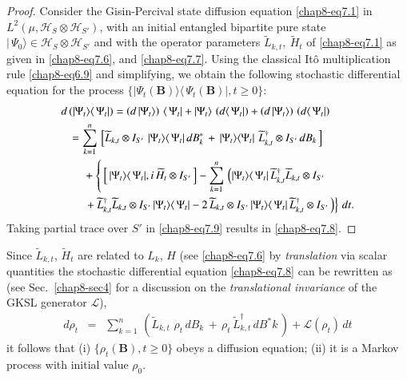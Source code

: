 \begin{proof}
Consider the Gisin-Percival state diffusion equation \eqref{chap8-eq7.1} in\break $L^2(\mu, \mathcal{H}_S\otimes\mathcal{H}_{S'})$, with an initial entangled bipartite pure state $\vert\,\Psi_0\rangle\in \mathcal{H}_S\otimes\mathcal{H}_{S'}$ and with the operator parameters  $\widetilde{L}_{k,t},\  \widetilde{H}_t$ of 
\eqref{chap8-eq7.1} as given in \eqref{chap8-eq7.6}, and \eqref{chap8-eq7.7}. Using the classical It{\^o} multiplication rule  \eqref{chap8-eq6.9} and simplifying, we obtain the following stochastic differential equation for the process $\{\vert\Psi_t(\mathbf{B})\rangle\langle\, \Psi_t(\mathbf{B})\vert, t\geq 0\}$:  
\begin{align}
		d\, & (\vert\Psi_t\rangle  \langle\, \Psi_t\vert)= \left( d\, \vert\Psi_t\rangle\right)\, \langle\,\Psi_t\vert+ \vert\Psi_t\rangle\, \left(d\langle\, \Psi_t\vert\right) + \left( d\, \vert\Psi_t\rangle\right)\,  \left(d\langle\, \Psi_t\vert\right) \notag\\
		&= \sum_{k=1}^{n}\,\left[\widetilde{L}_{k,t}\otimes I_{S'}\,\, \vert\Psi_t\rangle\langle\, \Psi_t\vert\, dB^*_{k}\, + \, \vert\Psi_t\rangle\langle \Psi_t\vert\,\,\widetilde{L}^\dag_{k,t}\otimes I_{S'}\,  dB_{k}\,\right]  \notag\\ 
		&\quad\; + \left\{\,  \left[\,\vert\Psi_t\rangle\langle\, \Psi_t\vert, i\, \widetilde{H}_{t}\otimes I_{S'}\, \right]  - \sum_{k=1}^{n}\, \left( \vert\Psi_t\rangle\langle\, \Psi_t\vert\, \widetilde{L}^\dag_{k,t} \widetilde{L}_{k,t}\otimes I_{S'} \right. \right. \notag\\ 
		&\quad\left. \left. {}+\widetilde{L}^{\dag}_{k,t} \widetilde{L}_{k,t}\otimes I_{S'}\, \vert\Psi_t\rangle\langle\, \Psi_t\vert - 2\, \widetilde{L}_{k,t}\otimes I_{S'}\, \vert\Psi_t\rangle\langle\, \Psi_t\vert\, \widetilde{L}^\dag_{k,t}\otimes I_{S'}\,\right)\right\}\, dt. \label{chap8-eq7.9}
\end{align}
Taking partial trace  over $S'$ in \eqref{chap8-eq7.9} results in \eqref{chap8-eq7.8}.
\end{proof}

\begin{remark}
Since $\widetilde{L}_{k,t}$, $\widetilde{H}_t$ are related to $L_k$, $H$ (see \eqref{chap8-eq7.6} by {\em translation}  via scalar quantities the stochastic differential equation \eqref{chap8-eq7.8} can be rewritten as  (see Sec.\ \ref{chap8-sec4}  for a discussion on the {\em translational invariance} of the GKSL generator $\mathcal{L}$),
\begin{eqnarray}
d\rho_t &=& \sum_{k=1}^{n}\,\left( \widetilde{L}_{k,t}\,\, \rho_t\, dB_{k}\, + \, \rho_t\,\widetilde{L}^\dag_{k,t}\, dB^*{k}\,\right) + \mathcal{L}(\rho_t)\, dt \label{chap8-eq7.10}
\end{eqnarray}
it follows that (i) $\{\rho_t(\mathbf{B}),t\geq 0\}$  obeys a diffusion equation; (ii) it is a Markov process with initial value $\rho_0$. 
\end{remark}

